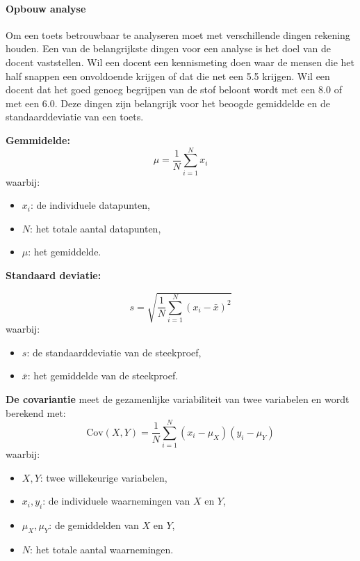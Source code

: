 \documentclass[12pt]{article}
\begin{document}
\begin{multicols}{2}
\paragraph*{Opbouw analyse} Om een toets betrouwbaar te analyseren moet met verschillende dingen rekening houden. Een van de belangrijkste dingen voor een analyse is het doel van de docent vaststellen. Wil een docent een kennismeting doen waar de mensen die het half snappen een onvoldoende krijgen of dat die net een 5.5 krijgen. Wil een docent dat het goed genoeg begrijpen van de stof beloont wordt met een 8.0 of met een 6.0. Deze dingen zijn belangrijk voor het beoogde gemiddelde en de standaarddeviatie van een toets.
\begin{minipage}{1\linewidth}
    
\textbf{Gemmidelde: }
\[
\mu = \frac{1}{N} \sum_{i=1}^N x_i
\]
waarbij:
\begin{itemize}
    \item \( x_i \): de individuele datapunten,
    \item \( N \): het totale aantal datapunten,
    \item \( \mu \): het gemiddelde.
\end{itemize}
\end{minipage}
\begin{minipage}{\linewidth}
\textbf{Standaard deviatie: }

\[
s = \sqrt{\frac{1}{N} \sum_{i=1}^N (x_i - \bar{x})^2}
\]
waarbij:
\begin{itemize}
    \item \( s \): de standaarddeviatie van de steekproef,
    \item \( \bar{x} \): het gemiddelde van de steekproef.
\end{itemize}
\end{minipage}
\begin{minipage}{\linewidth}
\textbf{De covariantie} meet de gezamenlijke variabiliteit van twee variabelen en wordt berekend met:
\[
\text{Cov}(X, Y) = \frac{1}{N} \sum_{i=1}^N (x_i - \mu_X)(y_i - \mu_Y)
\]
waarbij:
\begin{itemize}
    \item \(X, Y\): twee willekeurige variabelen,
    \item \(x_i, y_i\): de individuele waarnemingen van \(X\) en \(Y\),
    \item \(\mu_X, \mu_Y\): de gemiddelden van \(X\) en \(Y\),
    \item \(N\): het totale aantal waarnemingen.
\end{itemize}
\end{minipage}
\end{multicols}
\end{document}
